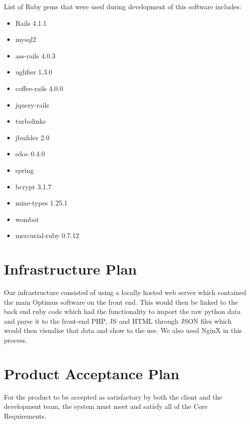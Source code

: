 List of Ruby gems that were used during development of this software includes:
\begin{itemize}
	\item Rails 4.1.1
	\item mysql2
	\item ass-rails 4.0.3
	\item uglifier 1.3.0
	\item coffee-rails 4.0.0
	\item jquery-rails
	\item turbolinks
	\item jbuilder 2.0
	\item sdoc 0.4.0
	\item spring
	\item bcrypt 3.1.7
	\item mine-types 1.25.1
	\item wombat
	\item mercurial-ruby 0.7.12
\end{itemize}


\section{Infrastructure Plan}

Our infrastructure consisted of using a locally hosted web server which contained the main Optimus software on the front end. This would then be linked to the back end ruby code which had the functionality to import the raw python data and parse it to the front-end PHP, JS and HTML through JSON files which would then visualise that data and show to the use. We also used NginX in this process.


\section{Product Acceptance Plan}

For the product to be accepted as satisfactory by both the client and the development team, the system must meet and satisfy all of the Core Requirements.



